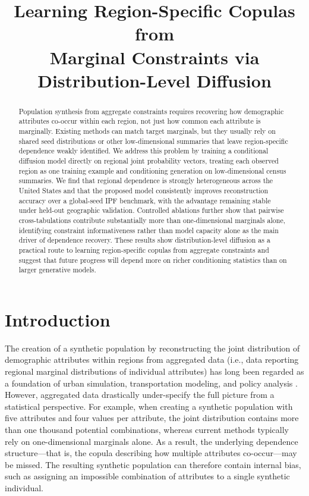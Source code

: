 \documentclass[11pt]{article}
\title{Learning Region-Specific Copulas from\\Marginal Constraints via Distribution-Level Diffusion}
\date{}
\begin{document}
\maketitle
\onehalfspacing

\begin{abstract}
Population synthesis from aggregate constraints requires recovering how demographic attributes co-occur within each region, not just how common each attribute is marginally. Existing methods can match target marginals, but they usually rely on shared seed distributions or other low-dimensional summaries that leave region-specific dependence weakly identified. We address this problem by training a conditional diffusion model directly on regional joint probability vectors, treating each observed region as one training example and conditioning generation on low-dimensional census summaries. We find that regional dependence is strongly heterogeneous across the United States and that the proposed model consistently improves reconstruction accuracy over a global-seed IPF benchmark, with the advantage remaining stable under held-out geographic validation. Controlled ablations further show that pairwise cross-tabulations contribute substantially more than one-dimensional marginals alone, identifying constraint informativeness rather than model capacity alone as the main driver of dependence recovery. These results show distribution-level diffusion as a practical route to learning region-specific copulas from aggregate constraints and suggest that future progress will depend more on richer conditioning statistics than on larger generative models.
\end{abstract}

\section{Introduction}
\label{sec:intro}

The creation of a synthetic population by reconstructing the joint distribution of demographic attributes within regions from aggregated data (i.e., data reporting regional marginal distributions of individual attributes) has long been regarded as a foundation of urban simulation, transportation modeling, and policy analysis \cite{mueller2011,barthelemy2013,la2025,chapuis2022}. However, aggregated data drastically under-specify the full picture from a statistical perspective. For example, when creating a synthetic population with five attributes and four values per attribute, the joint distribution contains more than one thousand potential combinations, whereas current methods typically rely on one-dimensional marginals alone. As a result, the underlying dependence structure---that is, the copula \cite{sklar1959} describing how multiple attributes co-occur---may be missed. The resulting synthetic population can therefore contain internal bias, such as assigning an impossible combination of attributes to a single synthetic individual.
\end{document}
